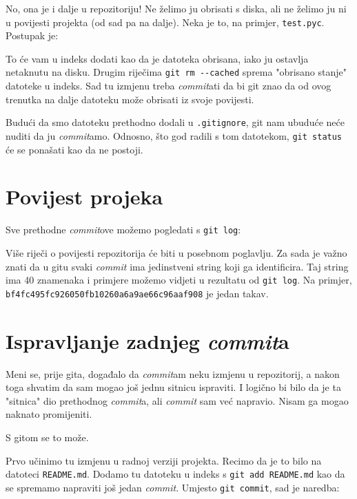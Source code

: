 No, ona je i dalje u repozitoriju!
Ne želimo ju obrisati s diska, ali ne želimo ju ni u povijesti projekta (od sad pa na dalje).
Neka je to, na primjer, \verb+test.pyc+.
Postupak je:


To će vam u indeks dodati kao da je datoteka obrisana, iako ju ostavlja netaknutu na disku.
Drugim riječima \verb+git rm --cached+ sprema "obrisano stanje" datoteke u indeks.
Sad tu izmjenu treba \emph{commit}ati da bi git znao da od ovog trenutka na dalje datoteku može obrisati iz svoje povijesti.

Budući da smo datoteku prethodno dodali u \verb+.gitignore+, git nam ubuduće neće nuditi da ju \emph{commit}amo.
Odnosno, što god radili s tom datotekom, \verb+git status+ će se ponašati kao da ne postoji.

\section*{Povijest projeka}

Sve prethodne \emph{commit}ove možemo pogledati s \verb+git log+:



Više riječi o povijesti repozitorija će biti u posebnom poglavlju. 
Za sada je važno znati da u gitu svaki \emph{commit} ima jedinstveni string koji ga identificira.
Taj string ima 40 znamenaka i primjere možemo vidjeti u rezultatu od \verb+git log+.
Na primjer, \\\verb+bf4fc495fc926050fb10260a6a9ae66c96aaf908+ je jedan takav.

\section*{Ispravljanje zadnjeg \emph{commit}a}

Meni se, prije gita, događalo da \emph{commit}am neku izmjenu u repozitorij, a nakon toga shvatim da sam mogao još jednu sitnicu ispraviti.
I logično bi bilo da je ta "sitnica" dio prethodnog \emph{commit}a, ali \emph{commit} sam već napravio.
Nisam ga mogao naknato promijeniti.

S gitom se to može.

Prvo učinimo tu izmjenu u radnoj verziji projekta. 
Recimo da je to bilo na datoteci \verb+README.md+.
Dodamo tu datoteku u indeks s \verb+git add README.md+ kao da se spremamo napraviti još jedan \emph{commit}.
Umjesto \verb+git commit+, sad je naredba:

